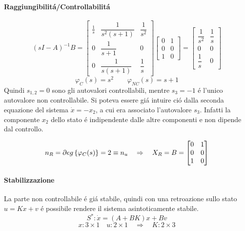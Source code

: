 \begin{Exercise}[title={Studio completo del sistema e stabilizzazione}, difficulty=3]
		\paragraph{Raggiungibilit\'a/Controllabilit\'a}
			\[
				(sI-A)^{-1}B =
				\begin{bmatrix}
					\frac{1}{s} & \dfrac{1}{s^2(s+1)} & \dfrac{1}{s^2}\\[.5cm]
					0 & \dfrac{1}{s+1} & 0\\[.5cm]
					0 & \dfrac{1}{s(s+1)} & \dfrac{1}{s}
				\end{bmatrix}
				\begin{bmatrix}
					0 & 1\\
					0 & 0\\
					1 & 0
				\end{bmatrix} =
				\begin{bmatrix}
					\dfrac{1}{s^2} & \dfrac{1}{s}\\[.5cm]
					0 & 0\\[.5cm]
					\dfrac{1}{s} & 0
				\end{bmatrix}
			\]
			\[ \varphi_C(s) = s^2 \qquad \varphi_{NC}(s) = s+1 \]
			Quindi $ s_{1,2} = 0 $ sono gli autovalori controllabili, mentre $ s_3 = -1 $ \'e l'unico autovalore non controllabile. Si poteva essere gi\'a intuire ci\'o dalla seconda equazione del sistema $ \dot x = -x_2 $, a cui era associato l'autovalore $ s_3 $. Infatti la componente $ x_2 $ dello stato \'e indipendente dalle altre componenti e non dipende dal controllo.
			
			\[
				n_R = \partial eg \left\lbrace \varphi_C(s) \right\rbrace = 2 \equiv n_u \quad\Rightarrow\quad X_R = B =
				\begin{bmatrix}
					0 & 1\\
					0 & 0\\
					1 & 0
				\end{bmatrix}
			\]
			
		\paragraph{Stabilizzazione}
			La parte non controllabile \'e gi\'a stabile, quindi con una retroazione sullo stato $ u = Kx + v $ \'e possibile rendere il sistema asintoticamente stabile.
			\[ S^{*}: \dot x = (A+BK)x + Bv \]
			\[ x: 3 \times 1 \quad u: 2 \times 1 \quad\Rightarrow\quad K: 2 \times 3 \]
			

\end{Exercise}
